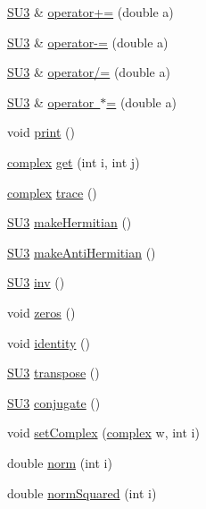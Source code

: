 \begin{DoxyCompactItemize}
\item 
\mbox{\hyperlink{class_s_u3}{S\+U3}} \& \mbox{\hyperlink{class_s_u3_a66ffbe776e74e2c20040096ea6577037}{operator+=}} (double a)
\item 
\mbox{\hyperlink{class_s_u3}{S\+U3}} \& \mbox{\hyperlink{class_s_u3_aaa29d14e952a9b9fcacad15f4a34c6d6}{operator-\/=}} (double a)
\item 
\mbox{\hyperlink{class_s_u3}{S\+U3}} \& \mbox{\hyperlink{class_s_u3_a9b49b10ffea08d20b5a89409501ef7d5}{operator/=}} (double a)
\item 
\mbox{\hyperlink{class_s_u3}{S\+U3}} \& \mbox{\hyperlink{class_s_u3_aa339fae3b75bd58fac445d38c68582d7}{operator $\ast$=}} (double a)
\item 
void \mbox{\hyperlink{class_s_u3_a40d6e853cd73f87b4113e22a53d45e89}{print}} ()
\item 
\mbox{\hyperlink{classcomplex}{complex}} \mbox{\hyperlink{class_s_u3_aa0c34df7c067dcbb917d18cf587046a2}{get}} (int i, int j)
\item 
\mbox{\hyperlink{classcomplex}{complex}} \mbox{\hyperlink{class_s_u3_ac1c6438d29178aa1255ee4f2f48d2430}{trace}} ()
\item 
\mbox{\hyperlink{class_s_u3}{S\+U3}} \mbox{\hyperlink{class_s_u3_a7035a3e94f6dd27ece144b42473cade9}{make\+Hermitian}} ()
\item 
\mbox{\hyperlink{class_s_u3}{S\+U3}} \mbox{\hyperlink{class_s_u3_a25e7cd46d60f25138585b76115e791a3}{make\+Anti\+Hermitian}} ()
\item 
\mbox{\hyperlink{class_s_u3}{S\+U3}} \mbox{\hyperlink{class_s_u3_ad0e19706d3c6fdb50dcf788d4b48eb4c}{inv}} ()
\item 
void \mbox{\hyperlink{class_s_u3_a9f3527fd882882ddfa18d72f5f43176c}{zeros}} ()
\item 
void \mbox{\hyperlink{class_s_u3_af84aef1d34a4fdcda292200804eb1221}{identity}} ()
\item 
\mbox{\hyperlink{class_s_u3}{S\+U3}} \mbox{\hyperlink{class_s_u3_af0229a4940c6c4355a2994ccaa663d0e}{transpose}} ()
\item 
\mbox{\hyperlink{class_s_u3}{S\+U3}} \mbox{\hyperlink{class_s_u3_a1db359a1ede38fcf858876292a8c9c43}{conjugate}} ()
\item 
void \mbox{\hyperlink{class_s_u3_a794ecde931082d02f625cab14d0e83e3}{set\+Complex}} (\mbox{\hyperlink{classcomplex}{complex}} w, int i)
\item 
double \mbox{\hyperlink{class_s_u3_a1f0faef4a7cf1a1a3e6ec525cef55561}{norm}} (int i)
\item 
double \mbox{\hyperlink{class_s_u3_a7926e38b8705e0f5c3eaf7d0361f3543}{norm\+Squared}} (int i)
\end{DoxyCompactItemize}
